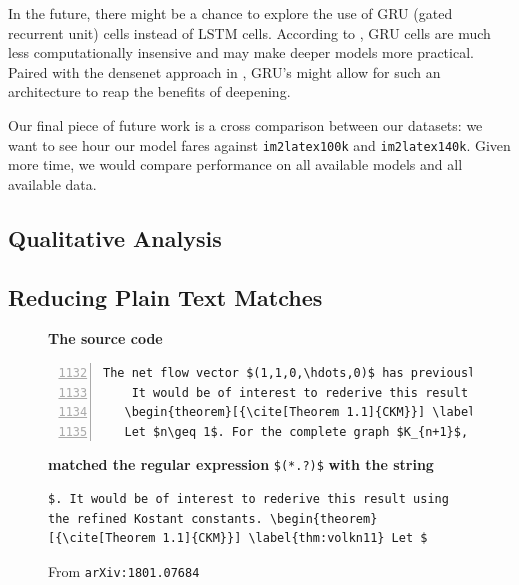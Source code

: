 \documentclass[12pt]{article}
\begin{document}
In the future, there might be a chance to explore the use of GRU (gated
recurrent unit) cells instead of LSTM cells. According to
\citeauthor{zhang2019dive}, GRU cells are much less computationally insensive
and may make deeper models more practical. Paired with the densenet approach in
\cite{wang2019translating}, GRU's might allow for such an architecture to reap
the benefits of deepening.

Our final piece of future work is a cross comparison between our datasets: we
want to see hour our model fares against \texttt{im2latex100k} and
\texttt{im2latex140k}. Given more time, we would compare performance on all
available models and all available data. 

\newpage
\begin{appendix}
  \section{Qualitative Analysis}
  \subsection{Reducing Plain Text Matches}

\begin{figure}[!h]
  \qquad \textbf{The source code}
  \begin{lstlisting}[escapechar=!, basicstyle=\footnotesize\ttfamily, numbers=left, firstnumber=1132]
    The net flow vector $(1,1,0,\hdots,0)$ has previously been considered for the complete graph by Corteel, Kim, and M\'esz\'aros \cite{CKM}.  They used the Lidskii formula~\eqref{eq:lidskiivol} and constant term identities to derive the following product formula for the volume of $\mathcal{F}_{K_{n+1}}(1,1,0,\ldot     s,0)$.
    It would be of interest to rederive this result using the refined Kostant constants.
   \begin{theorem}[{\cite[Theorem 1.1]{CKM}}] \label{thm:volkn11}
   Let $n\geq 1$. For the complete graph $K_{n+1}$,

  \end{lstlisting}
  \qquad \textbf{matched the regular expression} \verb|$(*.?)$| \textbf{with the string} 
  \begin{lstlisting}[basicstyle=\footnotesize\ttfamily]
  $. It would be of interest to rederive this result using the refined Kostant constants. \begin{theorem}[{\cite[Theorem 1.1]{CKM}}] \label{thm:volkn11} Let $    
  \end{lstlisting}
   \cprotect\caption{From \texttt{arXiv:1801.07684} \citeauthor{benedetti2018combinatorial} }\label{falsematch}
\end{figure}


\end{appendix}
\end{document}
